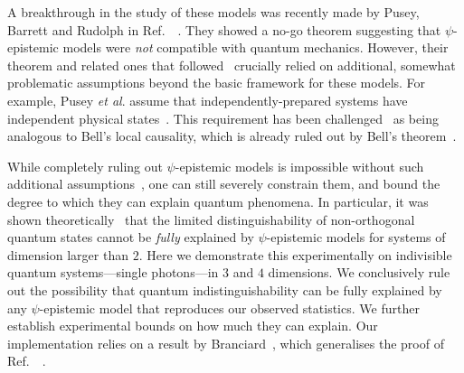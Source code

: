 \documentclass[aps,prl,floatfix,onecolumn,tightenlines,amsmath,amssymb,nofootinbib,12pt]{revtex4-2}
\begin{document}
A breakthrough in the study of these models was recently made by Pusey, Barrett and Rudolph in Ref.~~\cite{Pusey2012}. They showed a no-go theorem suggesting that $\psi$-epistemic models were \emph{not} compatible with quantum mechanics. However, their theorem and related ones that followed~\cite{Colbeck2011,hardy2013are,Patra2013no-,Aaronson2013,Colbeck2013} crucially relied on additional, somewhat problematic assumptions beyond the basic framework for these models.
For example, Pusey \emph{et al}. assume that independently-prepared systems have independent physical states~\cite{Pusey2012}. This requirement has been challenged~\cite{Emerson2013} as being analogous to Bell's local causality, which is already ruled out by Bell's theorem~\cite{Bell1964}.

While completely ruling out $\psi$-epistemic models is impossible without such additional assumptions~\cite{Lewis2012,Aaronson2013}, one can still severely constrain them, and bound the degree to which they can explain quantum phenomena. In particular, it was shown theoretically~\cite{Barrett2014,Leifer2014,Branciard2014a} that the limited distinguishability of non-orthogonal quantum states cannot be \emph{fully} explained by $\psi$-epistemic models for systems of dimension larger than $2$.
Here we demonstrate this experimentally on indivisible quantum systems---single photons---in $3$ and $4$ dimensions. We conclusively rule out the possibility that quantum indistinguishability can be fully explained by any $\psi$-epistemic model that reproduces our observed statistics. We further establish experimental bounds on how much they can explain.
Our implementation relies on a result by Branciard~\cite{Branciard2014a}, which generalises the proof of Ref.~~\cite{Barrett2014}.
\end{document}
